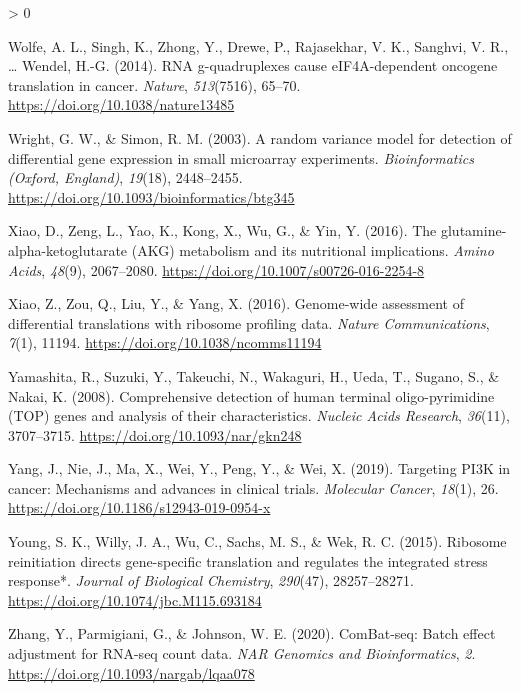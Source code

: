 \documentclass[
  12pt,
  openany]{book}
\newlength{\cslhangindent}
\newenvironment{CSLReferences}[2] %
 {%
  \setlength{\parindent}{0pt}
  \ifodd #1 \everypar{\setlength{\hangindent}{\cslhangindent}}\ignorespaces\fi
  \ifnum #2 > 0
  \setlength{\parskip}{#2\baselineskip}
  \fi
 }%
 {}
\begin{document}
\begin{CSLReferences}{1}{0}
\leavevmode\hypertarget{ref-Wolfe2014}{}%
Wolfe, A. L., Singh, K., Zhong, Y., Drewe, P., Rajasekhar, V. K., Sanghvi, V. R., \ldots{} Wendel, H.-G. (2014). {RNA} g-quadruplexes cause {eIF}4A-dependent oncogene translation in cancer. \emph{Nature}, \emph{513}(7516), 65--70. \url{https://doi.org/10.1038/nature13485}

\leavevmode\hypertarget{ref-Wright2003}{}%
Wright, G. W., \& Simon, R. M. (2003). A random variance model for detection of differential gene expression in small microarray experiments. \emph{Bioinformatics (Oxford, England)}, \emph{19}(18), 2448--2455. \url{https://doi.org/10.1093/bioinformatics/btg345}

\leavevmode\hypertarget{ref-Xiao2016a}{}%
Xiao, D., Zeng, L., Yao, K., Kong, X., Wu, G., \& Yin, Y. (2016). The glutamine-alpha-ketoglutarate ({AKG}) metabolism and its nutritional implications. \emph{Amino Acids}, \emph{48}(9), 2067--2080. \url{https://doi.org/10.1007/s00726-016-2254-8}

\leavevmode\hypertarget{ref-Xiao2016}{}%
Xiao, Z., Zou, Q., Liu, Y., \& Yang, X. (2016). Genome-wide assessment of differential translations with ribosome profiling data. \emph{Nature Communications}, \emph{7}(1), 11194. \url{https://doi.org/10.1038/ncomms11194}

\leavevmode\hypertarget{ref-Yamashita2008}{}%
Yamashita, R., Suzuki, Y., Takeuchi, N., Wakaguri, H., Ueda, T., Sugano, S., \& Nakai, K. (2008). Comprehensive detection of human terminal oligo-pyrimidine ({TOP}) genes and analysis of their characteristics. \emph{Nucleic Acids Research}, \emph{36}(11), 3707--3715. \url{https://doi.org/10.1093/nar/gkn248}

\leavevmode\hypertarget{ref-Yang2019}{}%
Yang, J., Nie, J., Ma, X., Wei, Y., Peng, Y., \& Wei, X. (2019). Targeting {PI}3K in cancer: Mechanisms and advances in clinical trials. \emph{Molecular Cancer}, \emph{18}(1), 26. \url{https://doi.org/10.1186/s12943-019-0954-x}

\leavevmode\hypertarget{ref-Young2015}{}%
Young, S. K., Willy, J. A., Wu, C., Sachs, M. S., \& Wek, R. C. (2015). Ribosome reinitiation directs gene-specific translation and regulates the integrated stress response*. \emph{Journal of Biological Chemistry}, \emph{290}(47), 28257--28271. \url{https://doi.org/10.1074/jbc.M115.693184}

\leavevmode\hypertarget{ref-Zhang2020}{}%
Zhang, Y., Parmigiani, G., \& Johnson, W. E. (2020). {ComBat}-seq: Batch effect adjustment for {RNA}-seq count data. \emph{{NAR} Genomics and Bioinformatics}, \emph{2}. \url{https://doi.org/10.1093/nargab/lqaa078}


\end{CSLReferences}
\end{document}
